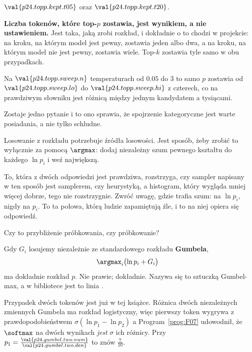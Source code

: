 \begin{fr}
\begin{ansblock}
$\val{p24.topp.kept.t05}$ oraz $\val{p24.topp.kept.t20}$.
\end{ansblock}

\textbf{Liczba tokenów, które top-$p$ zostawia, jest wynikiem, a nie
ustawieniem.} Jest taka, jaką zrobi rozkład, i dokładnie o to chodzi w
projekcie: na kroku, na którym model jest pewny, zostawia jeden albo dwa, a na
kroku, na którym model nie jest pewny, zostawia wiele. Top-$k$ zostawia tyle
samo w obu przypadkach.

Na $\val{p24.topp.sweep.n}$ temperaturach od $\num{0.05}$ do $3$ to samo $p$
zostawia od $\val{p24.topp.sweep.lo}$ do $\val{p24.topp.sweep.hi}$ z czterech,
co na prawdziwym słowniku jest różnicą między jednym kandydatem a tysiącami.

\end{fr}

\begin{fr}
Zostaje jedno pytanie i to ono sprawia, że spojrzenie kategoryczne jest warte
posiadania, a nie tylko schludne.

Losowanie z rozkładu potrzebuje źródła losowości. Jest sposób, żeby zrobić to
wyłącznie za pomocą $\argmax$: dodaj niezależny szum pewnego kształtu do
każdego $\ln p_i$ i weź największą.

To, która z dwóch odpowiedzi jest prawdziwa, rozstrzyga, czy sampler napisany
w ten sposób jest samplerem, czy heurystyką, a histogram, który wygląda mniej
więcej dobrze, tego nie rozstrzygnie. Zwróć uwagę, gdzie trafia szum: na
$\ln p_i$, nigdy na $p_i$. To ta połowa, którą ludzie zapamiętują źle, i to na
niej opiera się odpowiedź.

Czy to przybliżenie próbkowania, czy próbkowanie?
\dotline
\nextframe
\end{fr}

\begin{fr}

Gdy $G_i$ losujemy niezależnie ze standardowego rozkładu \textbf{Gumbela},
\[ \argmax_i \bigl(\ln p_i + G_i\bigr) \]
ma dokładnie rozkład $p$. Nie prawie; dokładnie. Nazywa się to sztuczką
Gumbel-max, a w bibliotece jest to linia
.

Przypadek dwóch tokenów jest już w tej książce. Różnica dwóch niezależnych
zmiennych Gumbela ma rozkład logistyczny, więc pierwszy token wygrywa z
prawdopodobieństwem $\sigma(\ln p_1 - \ln p_2)$ \dash{} a
Program~\ref{prog:F07} udowodnił, że $\softmax$ na dwóch wynikach \emph{jest}
$\sigma$ ich różnicy. Przy
$p_1 = \frac{\val{p24.gumbel.two.num}}{\val{p24.gumbel.two.den}}$ to znów
$\frac{7}{10}$.
\end{fr}

